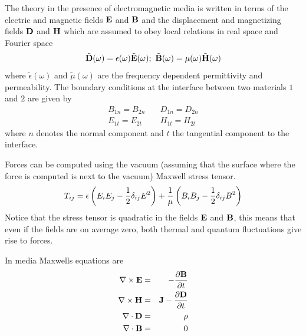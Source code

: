 The theory in the presence of electromagnetic media is written in terms of the electric and magnetic fields ${\bf E}$ and ${\bf B}$ and the displacement and magnetizing fields ${\bf D}$ and ${\bf H}$ which are assumed to obey local relations in real space and Fourier space
\begin{equation}
    \tilde {\bf D}(\omega)=\epsilon(\omega)\tilde{\bf E}(\omega); \ \tilde {\bf B}(\omega)= \mu(\omega) \tilde{\bf H}(\omega)
\end{equation}
where $\tilde\epsilon( \omega)$ and $\tilde\mu( \omega)$ are the frequency dependent
permittivity and permeability. The boundary conditions at the interface between two materials $1$ and $2$ are given by
\begin{eqnarray}
B_{1n}= B_{2n} && \ D_{1n}=D_{2n} \\
E_{1t} = E_{2t}  && \ H_{1t}=H_{2t}
\end{eqnarray}
where $n$ denotes the normal component and $t$ the tangential component to the interface.

Forces can be computed using the vacuum (assuming that the surface where the force is computed is next to the vacuum) Maxwell stress tensor.
\begin{equation}
    T_{ij}= \epsilon\left(E_iE_j -{1\over 2}\delta_{ij}E^2\right) + {1\over \mu}\left( B_i B_j -{1\over 2}\delta_{ij}B^2\right)
\end{equation}
Notice that the stress tensor is quadratic in the fields ${\bf E}$ and ${\bf B}$, this means that even if the fields are on average zero, both thermal and quantum fluctuations give rise to forces.

In media Maxwells equations are
\begin{eqnarray}
\nabla \times{\bf E} &=& -{\partial {\bf B}\over \partial t} \\
\nabla \times{\bf H} &=& {\bf J}-{\partial {\bf D}\over \partial t} \\
\nabla \cdot {\bf D} &=& \rho\\
\nabla \cdot {\bf B} &=& 0 
\end{eqnarray}

